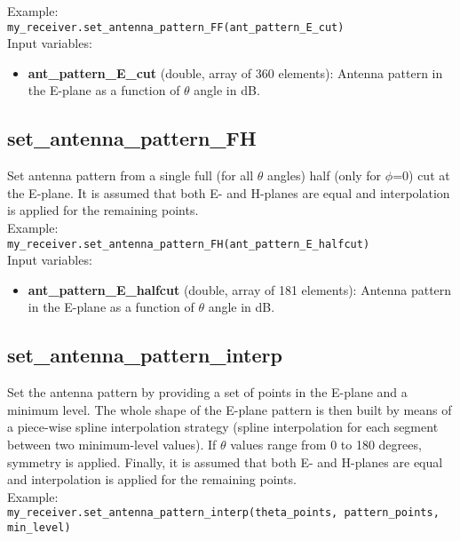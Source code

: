 Example:\\

\texttt{my\_receiver.set\_antenna\_pattern\_FF(ant\_pattern\_E\_cut)}\\

Input variables:
\begin{itemize}
\item {\bf ant\_pattern\_E\_cut} (double, array of 360 elements): Antenna pattern in the E-plane as a function of $\theta$ angle in dB.
\end{itemize}


\subsection{set\_antenna\_pattern\_FH}

Set antenna pattern from a single full (for all $\theta$ angles) half (only for $\phi$=0) cut at the E-plane. It is assumed that both E- and H-planes are equal and interpolation is applied for the remaining points.\\

Example:\\

\texttt{my\_receiver.set\_antenna\_pattern\_FH(ant\_pattern\_E\_halfcut)}\\

Input variables:
\begin{itemize}
\item {\bf ant\_pattern\_E\_halfcut} (double, array of 181 elements): Antenna pattern in the E-plane as a function of $\theta$ angle in dB.
\end{itemize}


\subsection{set\_antenna\_pattern\_interp}

Set the antenna pattern by providing a set of points in the E-plane and a minimum level. The whole shape of the E-plane pattern is then built by means of a piece-wise spline interpolation strategy (spline interpolation for each segment between two minimum-level values). If $\theta$ values range from 0 to 180 degrees, symmetry is applied. Finally, it is assumed that both E- and H-planes are equal and interpolation is applied for the remaining points.\\

Example:\\

\texttt{my\_receiver.set\_antenna\_pattern\_interp(theta\_points, pattern\_points, min\_level)}\\


